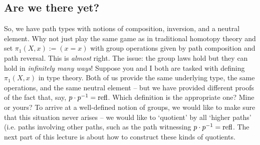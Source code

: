 \documentclass[10pt,oneside,leqno,openright]{memoir}
\begin{document}
\subsection*{Are we there yet?}
So, we have path types with notions of composition, inversion, and a neutral element. Why not just play the same game as in traditional homotopy theory and set $\pi_1(X,x) := (x = x)$ with group operations given by path composition and path reversal.
%
This is \emph{almost} right. The issue: the group laws hold but they
can hold in \emph{infinitely many ways}! Suppose you and I both are
tasked with defining $\pi_1(X,x)$ in type theory. Both of us provide
the same underlying type, the same operations, and the same neutral
element -- but we have provided different proofs of the fact that,
say, $p \cdot p^{-1} = \mathrm{refl}$. Which definition is the appropriate
one? Mine or yours? To arrive at a well-defined notion of groups, we
would like to make sure that this situation never arises -- we would
like to `quotient' by all `higher paths' (i.e. paths involving other
paths, such as the path witnessing $p\cdot p^{-1} = \mathrm{refl}$.
%
The next part of this lecture is about how to construct these kinds of quotients.
\end{document}
